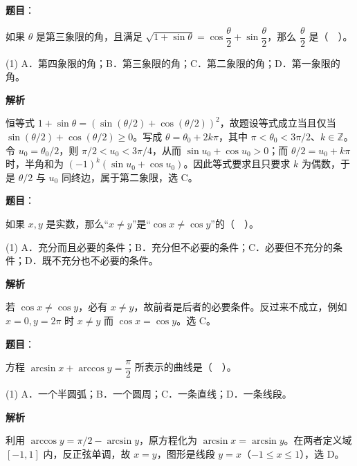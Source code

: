 \begin{answer}

\textbf{题目}：

如果 $\theta$ 是第三象限的角，且满足 $\sqrt{1+\sin\theta}=\cos\dfrac\theta2+\sin\dfrac\theta2$，那么 $\dfrac\theta2$ 是（　）。

\begin{gkopts}(1)
\task A．第四象限的角；B．第三象限的角；C．第二象限的角；D．第一象限的角。
\end{gkopts}

\textbf{解析}

恒等式 $1+\sin\theta=(\sin(\theta/2)+\cos(\theta/2))^2$，故题设等式成立当且仅当 $\sin(\theta/2)+\cos(\theta/2)\ge0$。写成 $\theta=\theta_0+2k\pi$，其中 $\pi<\theta_0<3\pi/2$、$k\in\mathbb Z$。令 $u_0=\theta_0/2$，则 $\pi/2<u_0<3\pi/4$，从而 $\sin u_0+\cos u_0>0$；而 $\theta/2=u_0+k\pi$ 时，半角和为 $(-1)^k(\sin u_0+\cos u_0)$。因此等式要求且只要求 $k$ 为偶数，于是 $\theta/2$ 与 $u_0$ 同终边，属于第二象限，选 C。


\end{answer}
\begin{answer}

\textbf{题目}：

如果 $x,y$ 是实数，那么“$x\ne y$”是“$\cos x\ne\cos y$”的（　）。

\begin{gkopts}(1)
\task A．充分而且必要的条件；B．充分但不必要的条件；C．必要但不充分的条件；D．既不充分也不必要的条件。
\end{gkopts}

\textbf{解析}

若 $\cos x\ne\cos y$，必有 $x\ne y$，故前者是后者的必要条件。反过来不成立，例如 $x=0,y=2\pi$ 时 $x\ne y$ 而 $\cos x=\cos y$。选 C。


\end{answer}
\begin{answer}

\textbf{题目}：

方程 $\arcsin x+\arccos y=\dfrac\pi2$ 所表示的曲线是（　）。

\begin{gkopts}(1)
\task A．一个半圆弧；B．一个圆周；C．一条直线；D．一条线段。
\end{gkopts}

\textbf{解析}

利用 $\arccos y=\pi/2-\arcsin y$，原方程化为 $\arcsin x=\arcsin y$。在两者定义域 $[-1,1]$ 内，反正弦单调，故 $x=y$，图形是线段 $y=x$（$-1\le x\le1$），选 D。


\end{answer}
